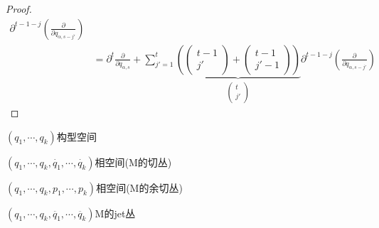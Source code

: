 \documentclass[12pt, a4paper, oneside, UTF8]{ctexbook}  %
\newcommand{\pa}{\partial}
\begin{document}
\begin{lemma}
\begin{proof}
\begin{align*}
        \pa^{t-1-j}
        \left(\frac{\partial}{\partial q_{\alpha,s-j'}}\right)\\
        &=\pa^t\frac{\pa }{\pa q_{\alpha,s}}+
        \sum_{j'=1}^{t}
    \underbrace{\left(\begin{pmatrix}
        t-1\\
        j'
    \end{pmatrix}+
    \begin{pmatrix}
    t-1\\
    j'-1
    \end{pmatrix}\right)}_{\begin{pmatrix}
        t\\j'\end{pmatrix}}
        \pa^{t-1-j}
        \left(\frac{\partial}{\partial q_{\alpha,s-j'}}\right)
    \end{align*}
\end{proof}
\end{lemma}
\begin{defn}
    \((q_1,\cdots,q_k)\)构型空间\par
    \((q_1,\cdots,q_k,\dot{q_1},\cdots,\dot{q_k})\)相空间(M的切丛)\par
    \((q_1,\cdots,q_k,p_1,\cdots,p_k)\)相空间(M的余切丛)\par
    \((q_1,\cdots,q_k,\ddot{q_1},\cdots,\ddot{q_k})\)M的jet丛
\end{defn}
\end{document}
